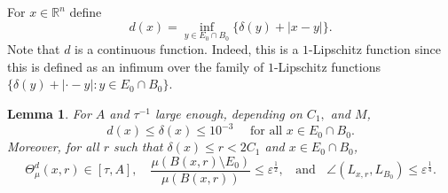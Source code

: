 \documentclass[11pt]{amsart}
\newcommand{\R}{{\mathbb R}}       %
\newcommand{\rf}[1]{{(\ref{#1})}}
\newcommand{\ve}{{\varepsilon}}
\newcommand{\Bl}{\color{blue}}
\newtheorem{lemma}[theorem]{Lemma}
\theoremstyle{definition}
\theoremstyle{remark}
\numberwithin{equation}{section}
\newcommand{\xavi}[1]{}%
\def\lec{\lesssim}
\def\lec{\lesssim}
\begin{document}


For $x\in \R^{n}$ define
\begin{equation}\label{def-d}
d(x) = \inf_{y\in E_{0}\cap  B_{0}} \bigl\{\delta(y) +|x-y|\bigr\}.
\end{equation}
Note that $d$ is a continuous function. Indeed, this is a $1$-Lipschitz function since this is defined
as an infimum over the family of $1$-Lipschitz functions $\bigl\{\delta(y) +|\cdot -y|: y\in E_{0}\cap  B_{0}\bigr\}$.
\xavi{I would erase the red text, since the new explanation I wrote before in terms of $1$-Lipschitz functions i
s simpler, in my opinion.}
 
 
\begin{lemma}\label{l:good-range}
For $A$ and $\tau^{-1}$ large enough, depending on $C_{1},$ and $M$, 
\begin{equation}
\label{e:delta0}
d(x)\leq \delta(x)\leq 10^{-3} \quad\mbox{ for all }x\in E_{0}\cap B_{0}.
\end{equation}
Moreover, for all $r$ such that $ \delta(x)\leq r<2C_{1}$ and $x\in E_{0}\cap B_{0}$,
\begin{equation}
\label{e:good-range}
\Theta^d_{\mu}(x,r)\in [\tau,A], 
\quad\frac{\mu(B(x,r)\setminus E_{0})}{ \mu(B(x,r))}\leq\ve^{\frac{1}{2}}, \;
\;\mbox{ and } \;\;  \angle(L_{x,r},L_{B_{0}})\leq \ve^{\frac14}.
\end{equation}
\end{lemma}
\end{document}
